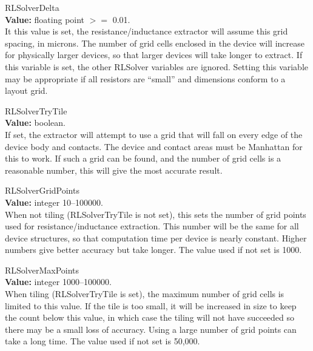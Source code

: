 \begin{description}
\item{\et RLSolverDelta}\\
{\bf Value:} floating point $>=$ 0.01.\\
It this value is set, the resistance/inductance extractor will assume
this grid spacing, in microns.  The number of grid cells enclosed in
the device will increase for physically larger devices, so that larger
devices will take longer to extract.  If this variable is set, the
other {\et RLSolver} variables are ignored.  Setting this variable may
be appropriate if all resistors are ``small'' and dimensions conform
to a layout grid.

\item{\et RLSolverTryTile}\\
{\bf Value:} boolean.\\
If set, the extractor will attempt to use a grid that will fall on
every edge of the device body and contacts.  The device and contact
areas must be Manhattan for this to work.  If such a grid can be
found, and the number of grid cells is a reasonable number, this will
give the most accurate result.

\item{\et RLSolverGridPoints}\\
{\bf Value:} integer 10--100000.\\
When not tiling ({\et RLSolverTryTile} is not set), this sets the
number of grid points used for resistance/inductance extraction.  This
number will be the same for all device structures, so that computation
time per device is nearly constant.  Higher numbers give better
accuracy but take longer.  The value used if not set is 1000.

\item{\et RLSolverMaxPoints}\\
{\bf Value:} integer 1000--100000.\\
When tiling ({\et RLSolverTryTile} is set), the maximum number of grid
cells is limited to this value.  If the tile is too small, it will be
increased in size to keep the count below this value, in which case
the tiling will not have succeeded so there may be a small loss of
accuracy.  Using a large number of grid points can take a long time. 
The value used if not set is 50,000.
\end{description}

